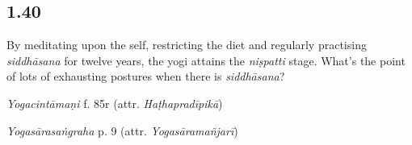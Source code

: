 \begin{ekdosis}
\begin{philcomm}[hp01_039]
\end{philcomm}

\subsection*{1.40}
\begin{translation}[hp01_040]
By meditating upon the self, restricting the diet and regularly practising \emph{siddhāsana} for twelve years, the yogi attains the \emph{niṣpatti} stage.
What’s the point of lots of exhausting postures when there is \emph{siddhāsana}?
\end{translation}


\begin{testimonia}[hp01_040]
\emph{Yogacintāmaṇi} f. 85r (attr. \emph{Haṭhapradīpikā})

\begin{versinnote}
\end{versinnote}

\emph{Yogasārasaṅgraha} p. 9 (attr. \emph{Yogasāramañjarī})

\begin{versinnote}
\end{versinnote}

\end{testimonia}

\begin{philcomm}[hp01_040]





\end{philcomm}
\end{ekdosis}

